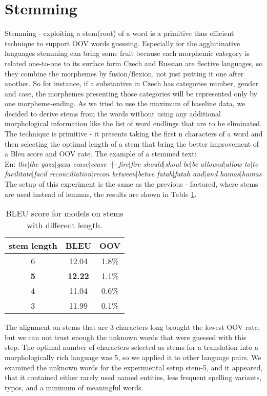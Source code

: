 \documentclass[11pt,letterpaper]{article}
\begin{document}
\section{Stemming}
Stemming - exploiting a stem(root) of a word is a primitive thus efficient technique to support OOV words guessing.
Especially for the agglutinative languages stemming can bring some fruit because
each morphemic category is related one-to-one to its surface form%
Czech and Russian are flective languages, so they combine the morphemes by fusion/flexion,
not just putting it one after another. So for instance, if a substantive in Czech has categories
 number, gender and case, the morphemes presenting those categories will be represented only
by one morpheme-ending. 
As we tried to use the maximum of baseline data, we decided to derive stems from the words
without using any additional morphological information like the list of word endlings that are to be eliminated.
The technique is primitive - it presents taking the first n characters of a word and then selecting the optimal
length of a stem that bring the better improvement of a Bleu score and OOV rate.
The example of a stemmed text:\\
En: \textit{the$|$the gaza$|$gaza cease$|$cease -$|$- fire$|$fire should$|$shoul be$|$be allowed$|$allow to$|$to facilitate$|$facil 
reconciliation$|$recon between$|$betwe fatah$|$fatah and$|$and hamas$|$hamas}
The setup of this experiment is the same as the previous - factored, where stems are used instead of lemmas,
the results are shown in Table \ref{tab:stem}.

\begin{table}
\begin{center}
\begin{tabular} {c c c}
\hline
stem length&BLEU&OOV\\
\hline
6 & 12.04&1.8\%\\
\bf{5} & \bf{12.22} &1.1\%\\
4 & 11.04& 0.6\%\\
3 & 11.99& 0.1\%\\
\hline
\end{tabular}
\caption{BLEU score for models on stems with different length.}
\label{tab:stem}
\end{center}
\end{table}

The alignment on stems that are 3 characters long brought the lowest OOV rate,
but we can not trust enough the unknown words that were guessed with this step.
The optimal number of characters selected as stems for a translation into a morphologically rich 
language was 5, so we applied it to other language pairs.
We examined the unknown words for the experimental setup stem-5, and it appeared, that it contained either 
rarely used named entities, less frequent spelling variants, typos, and a minimum of meaningful words. 
\end{document}
